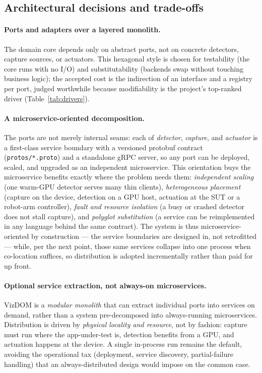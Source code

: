 \documentclass[11pt,a4paper]{article}
\newcommand{\code}[1]{\texttt{#1}}
\begin{document}
\subsection{Architectural decisions and trade-offs}
\label{sec:tradeoffs}
\paragraph{Ports and adapters over a layered monolith.} The domain core depends only
on abstract ports, not on concrete detectors, capture sources, or actuators. This
hexagonal style is chosen for testability (the core runs with no I/O) and
substitutability (backends swap without touching business logic); the accepted cost
is the indirection of an interface and a registry per port, judged worthwhile
because modifiability is the project's top-ranked driver (Table~\ref{tab:drivers}).

\paragraph{A microservice-oriented decomposition.} The ports are not merely internal
seams: each of \emph{detector}, \emph{capture}, and \emph{actuator} is a first-class
service boundary with a versioned protobuf contract (\code{protos/*.proto}) and a
standalone gRPC server, so any port can be deployed, scaled, and upgraded as an
independent microservice. This orientation buys the microservice benefits exactly
where the problem needs them: \emph{independent scaling} (one warm-GPU detector
serves many thin clients), \emph{heterogeneous placement} (capture on the device,
detection on a GPU host, actuation at the SUT or a robot-arm controller),
\emph{fault and resource isolation} (a busy or crashed detector does not stall
capture), and \emph{polyglot substitution} (a service can be reimplemented in any
language behind the same contract). The system is thus microservice-oriented by
construction --- the service boundaries are designed in, not retrofitted --- while,
per the next point, those same services collapse into one process when co-location
suffices, so distribution is adopted incrementally rather than paid for up front.

\paragraph{Optional service extraction, not always-on microservices.} VizDOM is a
\emph{modular monolith} that can extract individual ports into services on demand,
rather than a system pre-decomposed into always-running microservices. Distribution
is driven by \emph{physical locality and resource}, not by fashion: capture must run
where the app-under-test is, detection benefits from a GPU, and actuation happens at
the device. A single in-process run remains the default, avoiding the operational
tax (deployment, service discovery, partial-failure handling) that an
always-distributed design would impose on the common case.
\end{document}
